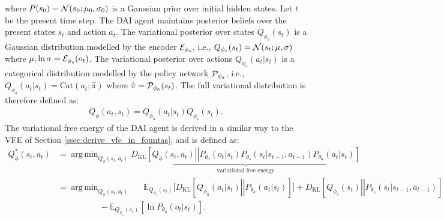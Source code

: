 \documentclass[twoside,11pt]{article}
\let\oldmathcal\mathcal
\renewcommand{\mathcal}[1]{%
  \IfSubStr{ABCDEFGHIJKLMNOPQRSTUVWXYZ}{#1}{\oldmathcal{#1}}{\mathdutchcal{#1}}
}
\newcommand{\kl}[2]{D_{\mathrm{KL}} \left[ \left. \left. #1 \right|\right| #2 \right] }
\DeclareMathOperator*{\argmin}{arg\,min}
\begin{document}
\noindent where $P(s_0) = \mathcal{N}(s_0;\mu_0,\sigma_0)$ is a Gaussian prior over initial hidden states. Let $t$ be the present time step. The DAI agent maintains posterior beliefs over the present states $s_t$ and action $a_t$. The variational posterior over states $Q_{\phi_s}(s_t)$ is a Gaussian distribution modelled by the encoder $\mathcal{E}_{\phi_s}$, i.e., $Q_{\phi_s}(s_t) = \mathcal{N}(s_t;\mu, \sigma)$ where $\mu, \ln\sigma = \mathcal{E}_{\phi_s}(o_t)$. The variational posterior over actions $Q_{\phi_a}(a_t|s_t)$ is a categorical distribution modelled by the policy network $\mathcal{P}_{\phi_a}$, i.e., $Q_{\phi_a}(a_t|s_t) = \text{Cat}(a_t;\hat{\pi})$ where $\hat{\pi} = \mathcal{P}_{\phi_a}(s_t)$. The full variational distribution is therefore defined as:
\begin{align*}
Q_{\phi}(a_t,s_t) = Q_{\phi_a}(a_t|s_t)Q_{\phi_s}(s_t).
\end{align*}
The variational free energy of the DAI agent is derived in a similar way to the VFE of Section \ref{ssec:derive_vfe_in_fountas}, and is defined as:
\begin{align}
Q^*_{\phi}(s_t, a_t) &= \argmin_{Q_{\phi}(s_t, a_t)}\underbrace{\kl{Q_{\phi}(s_t, a_t)}{P_{\theta_o}(o_t|s_t)P_{\theta_s}(s_t|s_{t-1},a_{t-1})P_{\theta_a}(a_t|s_t)}}_{\text{variational free energy}}\label{eq:vfe_defi_dai}\\
&= \argmin_{Q_{\phi}(s_t, a_t)} \quad\,\,\, \mathbb{E}_{Q_{\phi_s}(s_t)}\big[\kl{Q_{\phi_a}(a_t|s_t)}{P_{\theta_a}(a_t|s_t)}\big] + \kl{Q_{\phi_s}(s_t)}{P_{\theta_s}(s_t|s_{t-1},a_{t-1})}\nonumber\\
&\quad\qquad\qquad - \mathbb{E}_{Q_{\phi_s}(s_t)}[\ln P_{\theta_o}(o_t|s_t)].\nonumber
\end{align}
\end{document}
